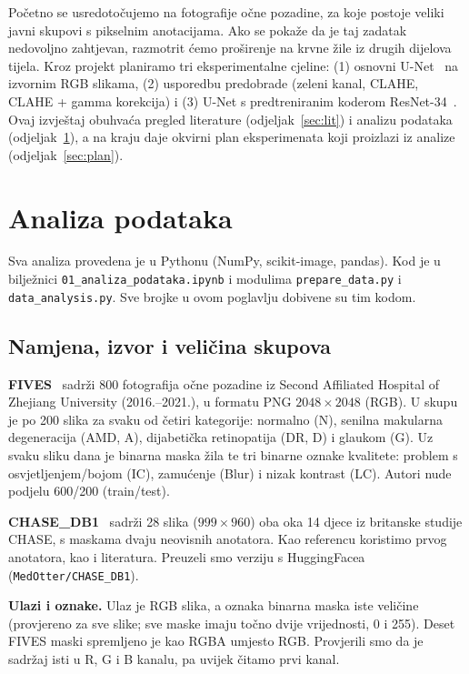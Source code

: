 \documentclass[conference]{IEEEtran}
\begin{document}
Početno se usredotočujemo na fotografije očne pozadine, za koje postoje veliki javni skupovi s pikselnim anotacijama. Ako se pokaže da je taj zadatak nedovoljno zahtjevan, razmotrit ćemo proširenje na krvne žile iz drugih dijelova tijela. Kroz projekt planiramo tri eksperimentalne cjeline: (1) osnovni U-Net~\cite{ronneberger2015} na izvornim RGB slikama, (2) usporedbu predobrade (zeleni kanal, CLAHE, CLAHE + gamma korekcija) i (3) U-Net s predtreniranim koderom ResNet-34~\cite{he2016}. Ovaj izvještaj obuhvaća pregled literature (odjeljak~\ref{sec:lit}) i analizu podataka (odjeljak~\ref{sec:data}), a na kraju daje okvirni plan eksperimenata koji proizlazi iz analize (odjeljak~\ref{sec:plan}).



\section{Analiza podataka}
\label{sec:data}
Sva analiza provedena je u Pythonu (NumPy, scikit-image, pandas). Kod je u bilježnici \texttt{01\_analiza\_podataka.ipynb} i modulima \texttt{prepare\_data.py} i \texttt{data\_analysis.py}. Sve brojke u ovom poglavlju dobivene su tim kodom.

\subsection{Namjena, izvor i veličina skupova}
\textbf{FIVES}~\cite{jin2022fives} sadrži 800 fotografija očne pozadine iz Second Affiliated Hospital of Zhejiang University (2016.--2021.), u formatu PNG $2048\times2048$ (RGB). U skupu je po 200 slika za svaku od četiri kategorije: normalno (N), senilna makularna degeneracija (AMD, A), dijabetička retinopatija (DR, D) i glaukom (G). Uz svaku sliku dana je binarna maska žila te tri binarne oznake kvalitete: problem s osvjetljenjem/bojom (IC), zamućenje (Blur) i nizak kontrast (LC). Autori nude podjelu 600/200 (train/test).

\textbf{CHASE\_DB1}~\cite{fraz2012ens} sadrži 28 slika ($999\times960$) oba oka 14 djece iz britanske studije CHASE, s maskama dvaju neovisnih anotatora. Kao referencu koristimo prvog anotatora, kao i literatura. Preuzeli smo verziju s HuggingFacea (\texttt{MedOtter/CHASE\_DB1}).

\textbf{Ulazi i oznake.} Ulaz je RGB slika, a oznaka binarna maska iste veličine (provjereno za sve slike; sve maske imaju točno dvije vrijednosti, 0 i 255). Deset FIVES maski spremljeno je kao RGBA umjesto RGB. Provjerili smo da je sadržaj isti u R, G i B kanalu, pa uvijek čitamo prvi kanal.
\end{document}
